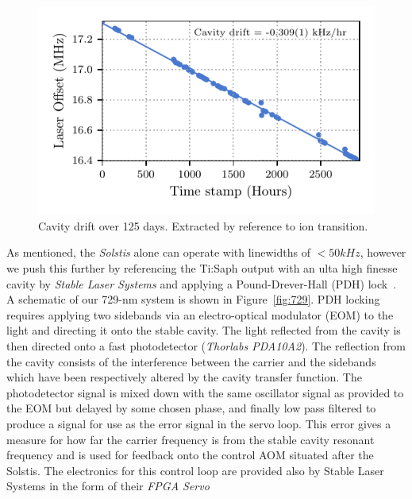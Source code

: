 \documentclass[12pt]{report}
\begin{document}
    \begin{figure}
        \begin{center}
        \noindent\includegraphics[width=\linewidth]{
            figures/pdf_figure/cavity_drift.pdf
            }
        \end{center}
        \caption{
            Cavity drift over 125 days. Extracted by reference to ion transition.
            }
        \label{fig:Cavity Drift}
    \end{figure}
    As mentioned, the \emph{Solstis} alone can operate with linewidths of
    $<50kHz$, however we push this further by referencing the Ti:Saph output
    with an ulta high finesse cavity by \emph{Stable Laser Systems} and applying
    a Pound-Drever-Hall (PDH) lock~\cite{}.  A schematic of our 729-nm system is
    shown in Figure~\ref{fig:729}.  PDH locking requires applying two sidebands
    via an electro-optical modulator (EOM) to the light and directing it onto
    the stable cavity. The light reflected from the cavity is then directed onto
    a fast photodetector (\emph{Thorlabs PDA10A2}). The reflection from the
    cavity consists of the interference between the carrier and the sidebands
    which have been respectively altered by the cavity transfer function. The
    photodetector signal is mixed down with the same oscillator signal as
    provided to the EOM but delayed by some chosen phase, and finally low pass
    filtered to produce a signal for use as the error signal in the servo loop.
    This error gives a measure for how far the carrier frequency is from the
    stable cavity resonant frequency and is used for feedback onto the control
    AOM situated after the Solstis. The electronics for this control loop are
    provided also by Stable Laser Systems in the form of their \emph{FPGA Servo}
\end{document}
